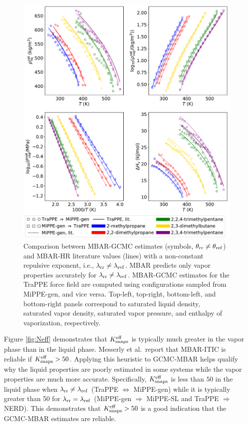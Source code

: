 \documentclass[journal=jced,manuscript=article]{achemso}
\begin{document}
	\begin{figure}[htb!]
		\centering
		\includegraphics[width=6.4in]{refFF_to_rrFF_lam_12to16.pdf}
		\caption{Comparison between MBAR-GCMC estimates (symbols, $\theta_{\rm rr} \neq \theta_{\rm ref}$) and MBAR-HR literature values (lines) with a non-constant repulsive exponent, i.e., $\lambda_{\rm rr} \neq \lambda_{\rm ref}$. MBAR predicts only vapor properties accurately for $\lambda_{\rm rr} \neq \lambda_{\rm ref}$. MBAR-GCMC estimates for the TraPPE force field are computed using configurations sampled from MiPPE-gen, and vice versa. Top-left, top-right, bottom-left, and bottom-right panels correspond to saturated liquid density, saturated vapor density, saturated vapor pressure, and enthalpy of vaporization, respectively.}
		\label{fig:refFF_to_rrFF_lam12to16}
	\end{figure}
Figure \ref{fig:Neff} demonstrates that $K_{\rm snaps}^{\rm eff}$ is typically much greater in the vapor phase than in the liquid phase. Messerly et al.~report that MBAR-ITIC is reliable if $K_{\rm snaps}^{\rm eff} > 50$. Applying this heuristic to GCMC-MBAR helps qualify why the liquid properties are poorly estimated in some systems while the vapor properties are much more accurate. Specifically, $K_{\rm snaps}^{\rm eff}$ is less than $50$ in the liquid phase when $\lambda_{\rm rr} \neq \lambda_{\rm ref}$ (TraPPE $\Leftrightarrow$ MiPPE-gen) while it is typically greater than 50 for $\lambda_{\rm rr} = \lambda_{\rm ref}$ (MiPPE-gen $\Rightarrow$ MiPPE-SL and TraPPE $\Rightarrow$ NERD). This demonstrates that $K_{\rm snaps}^{\rm eff} > 50$ is a good indication that the GCMC-MBAR estimates are reliable.
\end{document}
